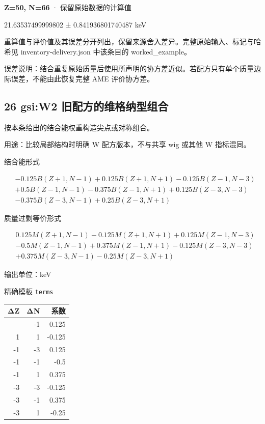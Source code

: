 \documentclass[
  11pt,
  letterpaper,
]{article}
\begin{document}
\textbf{Z=50, N=66} · 保留原始数据的计算值

21.63537499999802 ± 0.841936801740487 keV

重算值与评价值及其误差分开列出，保留来源舍入差异。完整原始输入、标记与哈希见
inventory-delivery.json 中该条目的 worked\_example。

误差说明：结合重复原始质量后使用所声明的协方差近似。若配方只有单个质量边际误差，不能由此恢复完整
AME 评价协方差。

\subsection{26 gsi:W2
旧配方的维格纳型组合}\label{gsiw2-ux65e7ux914dux65b9ux7684ux7ef4ux683cux7eb3ux578bux7ec4ux5408}

按本条给出的结合能权重构造尖点或对称组合。

用途：比较局部结构时明确 W 配方版本，不与共享 wig 或其他 W 指标混同。

结合能形式

\[
\begin{aligned}
& -0.125B(Z+1,N-1)+0.125B(Z+1,N+1)-0.125B(Z-1,N-3) \\
& +0.5B(Z-1,N-1)-0.375B(Z-1,N+1)+0.125B(Z-3,N-3) \\
& -0.375B(Z-3,N-1)+0.25B(Z-3,N+1)
\end{aligned}
\]

质量过剩等价形式

\[
\begin{aligned}
& 0.125M(Z+1,N-1)-0.125M(Z+1,N+1)+0.125M(Z-1,N-3) \\
& -0.5M(Z-1,N-1)+0.375M(Z-1,N+1)-0.125M(Z-3,N-3) \\
& +0.375M(Z-3,N-1)-0.25M(Z-3,N+1)
\end{aligned}
\]

输出单位：keV

精确模板 \texttt{terms}

\begin{longtable}[]{@{}rrr@{}}
\toprule\noalign{}
ΔZ & ΔN & 系数 \\
\midrule\noalign{}
\endhead
\bottomrule\noalign{}
\endlastfoot
1 & -1 & 0.125 \\
1 & 1 & -0.125 \\
-1 & -3 & 0.125 \\
-1 & -1 & -0.5 \\
-1 & 1 & 0.375 \\
-3 & -3 & -0.125 \\
-3 & -1 & 0.375 \\
-3 & 1 & -0.25 \\
\end{longtable}
\end{document}
